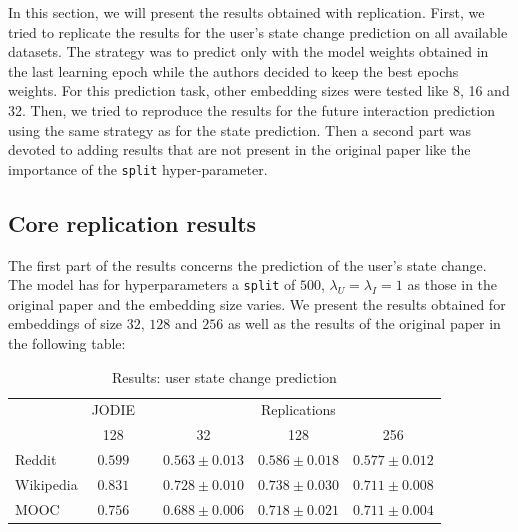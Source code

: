 In this section, we will present the results obtained with replication. First, we tried to replicate the results for the user's state change prediction on all available datasets. The strategy  was to predict only with the model weights obtained in the last learning epoch while the authors decided to keep the best epochs weights. For this prediction task, other embedding sizes were tested like 8, 16 and 32. Then, we tried to reproduce the results for the future interaction prediction using the same strategy as for the state prediction. Then a second part was devoted to adding results that are not present in the original paper like the importance of the \texttt{split} hyper-parameter.

\subsection*{Core replication results}
The first part of the results concerns the prediction of the user's state change. The model has for hyperparameters a \texttt{split} of $500$, $\lambda_U = \lambda_I = 1$ as those in the original paper and the embedding size varies. We present the results obtained for embeddings of size $32$, $128$ and $256$ as well as the results of the original paper in the following table:

\begin{table}[H]
    \centering
    \begin{tabular}{@{}lcrrrr@{}}
    \toprule
    & JODIE & \phantom{abc} & \multicolumn{3}{c}{Replications} \\
    \cmidrule{2-2} \cmidrule{4-6}
    & 128 && \multicolumn{1}{c}{32} & \multicolumn{1}{c}{128} & \multicolumn{1}{c}{256} \\
    \midrule
    Reddit & $\boldsymbol{0.599}$ && $0.563 \pm 0.013$ & $0.586 \pm 0.018$ & $0.577 \pm 0.012$\\
    Wikipedia &$\boldsymbol{0.831}$ && $0.728 \pm 0.010$ & $0.738 \pm 0.030$ & $0.711 \pm 0.008$\\
    MOOC &$\boldsymbol{0.756}$ && $0.688 \pm 0.006$ & $0.718 \pm 0.021$ & $0.711 \pm 0.004$\\
    \bottomrule
    \end{tabular}
    \caption{Results: user state change prediction}
\end{table}

